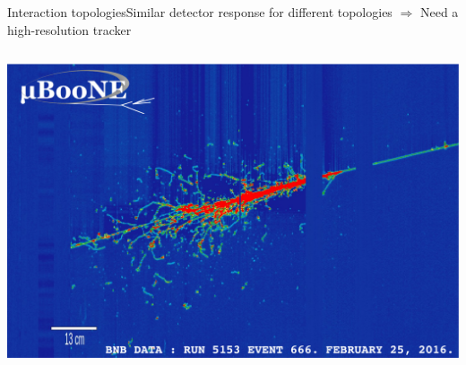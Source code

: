 \documentclass[]{beamer}
\newcommand*{\emphcol}{red}
\begin{document}
\begin{frame}{Interaction topologies}{Similar detector response for different topologies $\Rightarrow$ {\color{\emphcol} Need a high-resolution tracker}}
\begin{columns}[c]
		\includegraphics[width=\textwidth]{defence/uboone_em-shower}
	\end{columns}
\end{frame}
\end{document}
